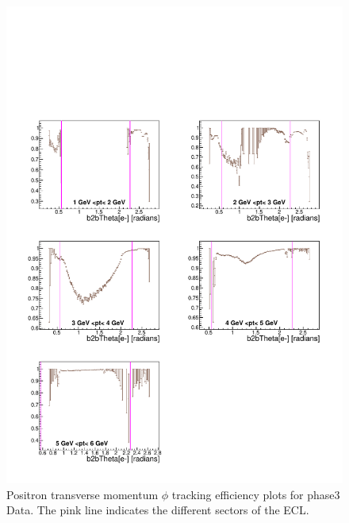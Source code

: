 \documentclass[a4paper,11pt,twosided,final,german,openbib,pdftex,listof=totoc,bibliography=totoc]{scrbook}
\begin{document}
\begin{appendix}
\begin{figure}[!htbp]
	\centering
	\includegraphics[width=\textwidth]{Plots/master3/xPtMThetaep_DataP3}
	\caption[Transverse Momentum $\theta$ Positron Efficiency Phase3 Data]{Positron transverse momentum $\phi$ tracking efficiency plots for phase3 Data. The pink line indicates the different sectors of the ECL.}
	\label{plt:PtMThetaep3_Data}
\end{figure}



\end{appendix}
\end{document}
